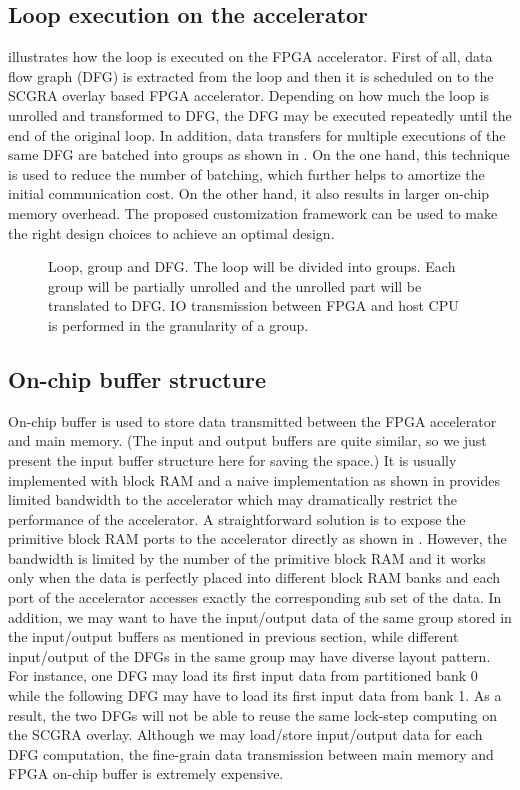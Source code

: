 \subsection{Loop execution on the accelerator}
 illustrates how the loop is executed 
on the FPGA accelerator. First of all, data flow graph (DFG) is extracted 
from the loop and then it is scheduled on to the SCGRA overlay based FPGA accelerator. 
Depending on how much the loop is unrolled and transformed to DFG, the DFG may be 
executed repeatedly until the end of the original loop. In addition, data transfers for 
multiple executions of the same DFG are batched into groups as shown in . 
On the one hand, this technique is used to reduce the number of batching, which further 
helps to amortize the initial communication cost. On the other hand, it also 
results in larger on-chip memory overhead. The proposed customization framework 
can be used to make the right design choices to achieve an optimal design. 

\begin{figure}[tb]
\caption{Loop, group and DFG. The loop will be divided into 
groups. Each group will be partially unrolled and the unrolled part will be 
translated to DFG. IO transmission between FPGA and host CPU is performed 
in the granularity of a group.}
\label{fig:group-dfg}
\end{figure}

\subsection{On-chip buffer structure}
On-chip buffer is used to store data transmitted between the FPGA 
accelerator and main memory. (The input and output buffers are quite similar, so 
we just present the input buffer structure here for saving the space.) 
It is usually implemented with block RAM and 
a naive implementation as shown in  
provides limited bandwidth to the accelerator which may dramatically 
restrict the performance of the accelerator. A straightforward solution is to 
expose the primitive block RAM ports to the accelerator 
directly as shown in . However, the bandwidth is 
limited by the number of the primitive block RAM and it works only when 
the data is perfectly placed into different block RAM banks and each port of 
the accelerator accesses exactly the corresponding sub set of the data. In addition, 
we may want to have the input/output data of the same group stored in the input/output 
buffers as mentioned in previous section, while different input/output of the 
DFGs in the same group may have diverse layout pattern. For instance, one DFG 
may load its first input data from partitioned bank 0 while the 
following DFG may have to load its first input data from bank 1. As a result, 
the two DFGs will not be able to reuse the same lock-step computing on the SCGRA overlay. 
Although we may load/store input/output data for each DFG computation, the 
fine-grain data transmission between main memory and FPGA on-chip buffer is extremely 
expensive.

